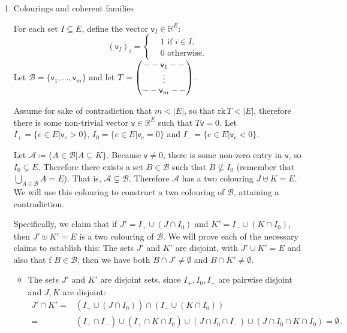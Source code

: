 \documentclass[kulak]{tplt}
\theoremstyle{definition}
\newcommand{\R}{\mathbb{R}}
\newcommand{\vv}{\mathsf{v}}
\newcommand{\rk}{\mathrm{rk}}
\begin{document}
\begin{enumerate}
\item Colourings and coherent families

For each set $I \subseteq E$, define the vector $\vv_I \in \R^E$:
$$ (\vv_I)_i =\begin{cases*}
      & 1 \text{ if $i \in I$,}\\
      & 0 \text{ otherwise.}
    \end{cases*} $$
Let $\mathcal B = \{\vv_1, \ldots, \vv_m\}$ and let $T = \begin{pmatrix}
\-- \-- \vv_1 \-- \-- \\
\vdots \\
\-- \-- \vv_m \-- \-- 
\end{pmatrix}$.

Assume for sake of contradiction that $m < |E|$, so that $\rk \, T < |E|$, therefore there is some non-trivial vector $\vv \in \R^E$ such that $T \vv = 0$.
Let $I_+ = \{e \in E | \vv_e > 0\}$, $I_0 = \{e \in E | \vv_e = 0\}$ and $I_- = \{e \in E | \vv_e < 0\}$.

Let $\mathcal A \coloneqq \{ A \in \mathcal B | A \subseteq K\}$.
Because $\vv \neq 0$, there is some non-zero entry in $\vv$, so $I_0\subsetneq E$.
Therefore there exists a set $B \in \mathcal B$ such that $B \not\subseteq I_0$ (remember that $\bigcup_{A \in \mathcal B} A = E$).
That is, $\mathcal A \subsetneq \mathcal B$.
Therefore $\mathcal A$ has a two colouring $J \uplus K = E$.
We will use this colouring to construct a two colouring of $\mathcal B$, attaining a contradiction.

Specifically, we claim that if $J' = I_+ \cup (J \cap I_0) $ and $K' = I_- \cup (K \cap I_0)$, then $J' \uplus K' = E$ is a two colouring of $\mathcal B$.
We will prove each of the necessary claims to establish this: The sets $J'$ and $K'$ are disjoint, with $J' \cup K' = E$ and also that f $B \in \mathcal B$, then we have both $B \cap J' \neq \emptyset $ and $B \cap K' \neq \emptyset $.

\begin{itemize}
\item The sets $J'$ and $K'$ are disjoint sets, since $I_+, I_0, I_-$ are pairwise disjoint and $J, K$ are disjoint:
\begin{align*}
J' \cap K' =& \left( I_+ \cup (J \cap I_0) \right) \cap \left( I_- \cup (K \cap I_0) \right)\\
=& (I_+ \cap I_-) \cup (I_+ \cap K \cap I_0) \cup (J \cap I_0 \cap I_- ) \cup (J \cap I_0 \cap K \cap I_0) = \emptyset \, . 
\end{align*}


\end{itemize}
\end{enumerate}
\end{document}
